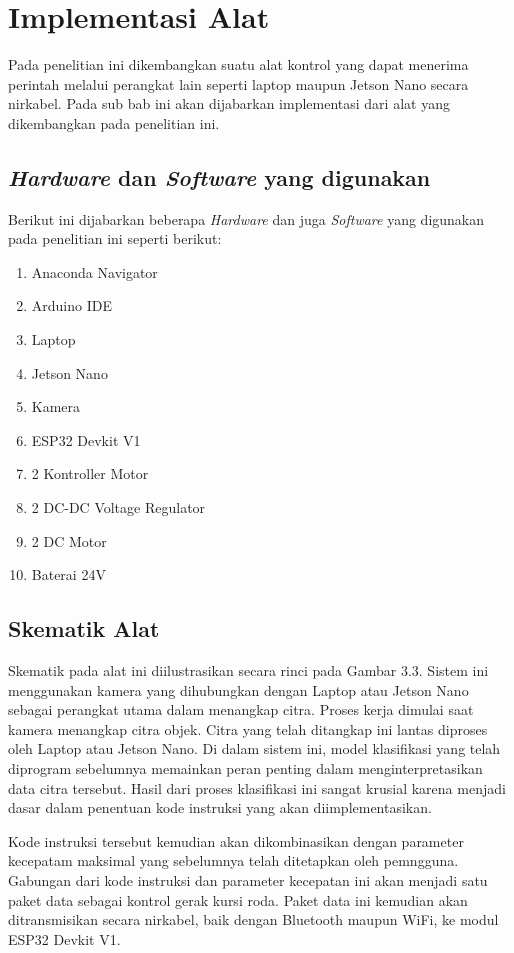 \section{Implementasi Alat}
\label{sec:implementasi alat}

Pada penelitian ini dikembangkan suatu alat kontrol yang dapat menerima perintah melalui perangkat lain seperti laptop maupun Jetson Nano secara nirkabel. Pada sub bab ini akan dijabarkan implementasi dari alat yang dikembangkan pada penelitian ini.

\subsection{\emph{Hardware} dan \emph{Software} yang digunakan}
Berikut ini dijabarkan beberapa \emph{Hardware} dan juga \emph{Software} yang digunakan pada penelitian ini seperti berikut:
\begin{enumerate}[nosep]
    \item Anaconda Navigator
    \item Arduino IDE 
    \item Laptop 
    \item Jetson Nano
    \item Kamera
    \item ESP32 Devkit V1
    \item 2 Kontroller Motor
    \item 2 DC-DC Voltage Regulator
    \item 2 DC Motor
    \item Baterai 24V
\end{enumerate}

\subsection{Skematik Alat}
Skematik pada alat ini diilustrasikan secara rinci pada Gambar 3.3. Sistem ini menggunakan kamera yang dihubungkan dengan Laptop atau Jetson Nano sebagai perangkat utama dalam menangkap citra. Proses kerja dimulai saat kamera menangkap citra objek. Citra yang telah ditangkap ini lantas diproses oleh Laptop atau Jetson Nano. Di dalam sistem ini, model klasifikasi yang telah diprogram sebelumnya memainkan peran penting dalam menginterpretasikan data citra tersebut. Hasil dari proses klasifikasi ini sangat krusial karena menjadi dasar dalam penentuan kode instruksi yang akan diimplementasikan.

Kode instruksi tersebut kemudian akan dikombinasikan dengan parameter kecepatam maksimal yang sebelumnya telah ditetapkan oleh pemngguna. Gabungan dari kode instruksi dan parameter kecepatan ini akan menjadi satu paket data sebagai kontrol gerak kursi roda. Paket data ini kemudian akan ditransmisikan secara nirkabel, baik dengan Bluetooth maupun WiFi, ke modul ESP32 Devkit V1. 

